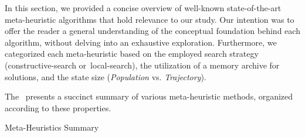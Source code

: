 In this section, we provided a concise overview of well-known state-of-the-art
meta-heuristic algorithms that hold relevance to our study. Our intention was to
offer the reader a general understanding of the conceptual foundation behind each
algorithm, without delving into an exhaustive exploration. Furthermore, we
categorized each meta-heuristic based on the employed search strategy
(\acrshort{constructive-search} or~\acrshort{local-search}), the utilization of a memory archive for
solutions, and the state size (\textit{Population} vs. \textit{Trajectory}).

The~ presents a succinct summary of various
meta-heuristic methods, organized according to these properties.

\begin{table}[ht]
  
  \caption{Meta-Heuristics Summary}
  \label{tab:meta-heuristics-summary}
\end{table}